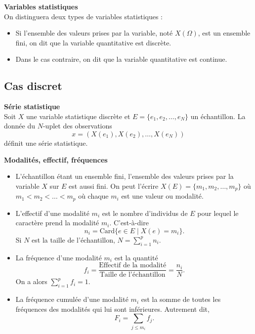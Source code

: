 \documentclass[../PolyS4.tex]{subfiles}
\begin{document}
\begin{Def}\textbf{Variables statistiques}\\

On distinguera deux types de variables statistiques :
\begin{itemize}
    \item Si l'ensemble des valeurs prises par la variable, noté $X(\Omega)$, est un ensemble fini, on dit que la variable quantitative est discrète.
    \item Dans le cas contraire, on dit que la variable quantitative est continue.
\end{itemize}
\end{Def}

\subsection{Cas discret}

\begin{Def}\textbf{Série statistique}\\

Soit $X$ une variable statistique discrète et $E = \{e_1, e_2, \ldots, e_N\}$ un échantillon. La donnée du $N$-uplet des observations
\[
x = (X(e_1), X(e_2), \ldots, X(e_N))
\]
définit une série statistique.
\end{Def}

\begin{Def}\textbf{Modalités, effectif, fréquences}\\

\begin{itemize}
    \item L'échantillon étant un ensemble fini, l'ensemble des valeurs prises par la variable $X$ sur $E$ est aussi fini. On peut l'écrire $X(E) = \{m_1, m_2, \ldots, m_p\}$ où $m_1 < m_2 < \ldots < m_p$ où chaque $m_i$ est une valeur ou modalité.
    \item L'effectif d'une modalité $m_i$ est le nombre d'individus de $E$ pour lequel le caractère prend la modalité $m_i$. C'est-à-dire
    \[
    n_i = \text{Card} \{e \in E \mid X(e) = m_i\}.
    \]
    Si $N$ est la taille de l'échantillon, $N = \sum_{i=1}^{p} n_i$.
    \item La fréquence d'une modalité $m_i$ est la quantité
    \[
    f_i = \frac{\text{Effectif de la modalité}}{\text{Taille de l'échantillon}} = \frac{n_i}{N}.
    \]
    On a alors $\sum_{i=1}^{p} f_i = 1$.
    \item La fréquence cumulée d'une modalité $m_i$ est la somme de toutes les fréquences des modalités qui lui sont inférieures. Autrement dit,
    \[
    F_i = \sum_{j \leq m_i} f_j.
    \]
\end{itemize}
\end{Def}
\end{document}
